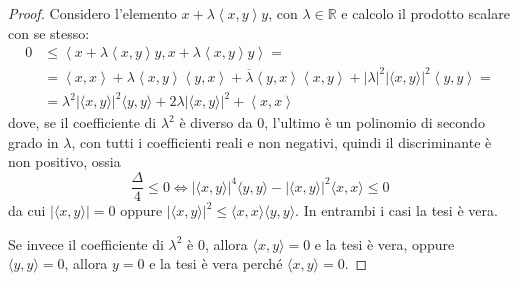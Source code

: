 \begin{proof}
    Considero l'elemento \(x + \lambda \left<x, y \right>y\), con \(\lambda \in
    \mathbb{R}\) e calcolo il prodotto scalare con se stesso:
    \begin{align*}
        0 &\le \left<x + \lambda \left<x, y \right>y, x + \lambda\left<x,y \right> y
        \right> = \\ &= \left<x, x \right> +
        \lambda \left<x, y \right> \left<y, x \right> + \overline{\lambda }
        \left<y, x \right> \left<x, y \right> + |\lambda|^{2} \left| \langle x,y
        \rangle \right|^2  \left<y, y
        \right>  = \\ &= \lambda^2 |\langle x,y \rangle|^2 \langle y,y \rangle + 2 \lambda |\langle x,y
        \rangle|^2 + \left<x,x \right>
    \end{align*}
    dove, se il coefficiente di \(\lambda^2\) è diverso da 0,  l'ultimo è un
    polinomio di secondo grado in \(\lambda\), con tutti i coefficienti reali e
    non negativi, quindi il discriminante è non positivo, ossia
    \[
        \frac{\Delta}{4} \le  0 \iff |\langle x,y \rangle|^{4} \langle y,y \rangle - |\langle x,y 
        \rangle|^2 \langle x,x \rangle \le 0
    \]
    da cui \(\displaystyle |\langle x,y \rangle| = 0\) oppure
    \(\displaystyle |\langle x,y \rangle|^{2} \le  \langle x,x \rangle \langle
    y,y \rangle\). In entrambi i casi la tesi è vera.

    Se invece il coefficiente di \(\lambda^2\) è 0, allora \(\langle x,y
    \rangle = 0\) e la tesi è vera, oppure \(\langle y,y \rangle = 0\), allora
    \(y = 0\) e la tesi è vera perché \(\langle x,y \rangle = 0\).
\end{proof}

